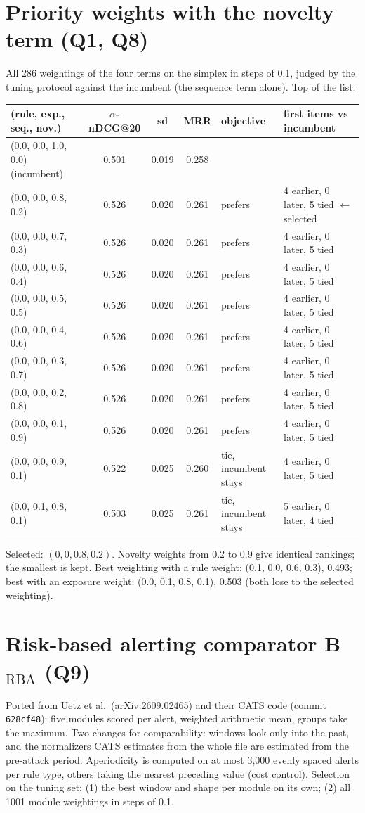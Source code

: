 \documentclass[10.5pt,a4paper]{article}
\begin{document}
\section{Priority weights with the novelty term (Q1, Q8)}
All 286 weightings of the four terms on the simplex in steps of 0.1, judged by the tuning protocol against the incumbent (the sequence term alone). Top of the list:
\begin{center}\small
\begin{tabular}{@{}l c c c l l@{}}
\toprule
(rule, exp., seq., nov.) & $\alpha$-nDCG@20 & sd & MRR & objective & first items vs incumbent \\
\midrule
(0.0, 0.0, 1.0, 0.0) (incumbent) & 0.501 & 0.019 & 0.258 & & \\
(0.0, 0.0, 0.8, 0.2) & 0.526 & 0.020 & 0.261 & prefers & 4 earlier, 0 later, 5 tied $\leftarrow$ selected \\
(0.0, 0.0, 0.7, 0.3) & 0.526 & 0.020 & 0.261 & prefers & 4 earlier, 0 later, 5 tied \\
(0.0, 0.0, 0.6, 0.4) & 0.526 & 0.020 & 0.261 & prefers & 4 earlier, 0 later, 5 tied \\
(0.0, 0.0, 0.5, 0.5) & 0.526 & 0.020 & 0.261 & prefers & 4 earlier, 0 later, 5 tied \\
(0.0, 0.0, 0.4, 0.6) & 0.526 & 0.020 & 0.261 & prefers & 4 earlier, 0 later, 5 tied \\
(0.0, 0.0, 0.3, 0.7) & 0.526 & 0.020 & 0.261 & prefers & 4 earlier, 0 later, 5 tied \\
(0.0, 0.0, 0.2, 0.8) & 0.526 & 0.020 & 0.261 & prefers & 4 earlier, 0 later, 5 tied \\
(0.0, 0.0, 0.1, 0.9) & 0.526 & 0.020 & 0.261 & prefers & 4 earlier, 0 later, 5 tied \\
(0.0, 0.0, 0.9, 0.1) & 0.522 & 0.025 & 0.260 & tie, incumbent stays & 4 earlier, 0 later, 5 tied \\
(0.0, 0.1, 0.8, 0.1) & 0.503 & 0.025 & 0.261 & tie, incumbent stays & 5 earlier, 0 later, 4 tied \\
\bottomrule
\end{tabular}
\end{center}
Selected: $(0, 0, 0.8, 0.2)$. Novelty weights from 0.2 to 0.9 give identical rankings; the smallest is kept. Best weighting with a rule weight: (0.1, 0.0, 0.6, 0.3), 0.493; best with an exposure weight: (0.0, 0.1, 0.8, 0.1), 0.503 (both lose to the selected weighting).

\section{Risk-based alerting comparator B$_\mathrm{RBA}$ (Q9)}
Ported from Uetz et al.\ (arXiv:2609.02465) and their CATS code (commit \texttt{628cf48}): five modules scored per alert, weighted arithmetic mean, groups take the maximum. Two changes for comparability: windows look only into the past, and the normalizers CATS estimates from the whole file are estimated from the pre-attack period. Aperiodicity is computed on at most 3{,}000 evenly spaced alerts per rule type, others taking the nearest preceding value (cost control). Selection on the tuning set: (1) the best window and shape per module on its own; (2) all 1001 module weightings in steps of 0.1.
\end{document}
